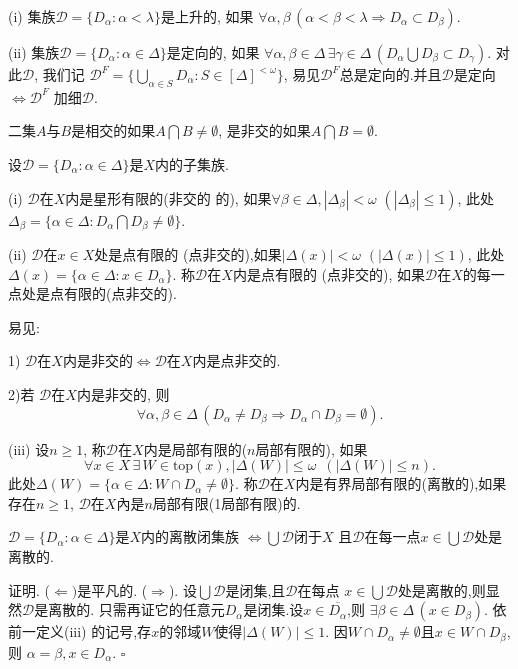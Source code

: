 \documentclass[main.tex]{subfiles}
\begin{document}
\begin{definition}
\textnormal{(i)} 集族$\mathscr{D}=\{D_\alpha: \alpha<\lambda\}$是上升的,
如果
$\forall\alpha, \beta \,(\alpha < \beta < \lambda \Rightarrow D_\alpha \subset D_\beta )$.

\textnormal{(ii)}  集族$\mathscr{D}=\{D_\alpha: \alpha\in\Delta\}$是定向的,
如果
$\forall\alpha, \beta\in\Delta\,\exists \gamma\in \Delta\,
(D_\alpha \bigcup D_\beta \subset D_\gamma)$.
对此$\mathscr{D}$, 我们记
$\mathscr{D}^F = \{\bigcup_{\alpha\in S} D_\alpha: S\in [\Delta]^{<\omega}\}$,
易见$\mathscr{D}^F$总是定向的.并且$\mathscr{D}$是定向
$\Leftrightarrow \mathscr{D}^F$ 加细$\mathscr{D}$.
\end{definition}
二集$A$与$B$是相交的如果$A\bigcap B\ne \emptyset$, 
是非交的如果$A\bigcap B=\emptyset$.

\begin{definition}
设$\mathscr{D}=\{D_\alpha: \alpha\in \Delta\}$是$X$内的子集族.

\textnormal{(i)} $\mathscr{D}$在$X$内是星形有限的\textnormal{(}非交的
的\textnormal{)}, 如果$\forall\beta\in\Delta, |\Delta_\beta| < \omega$ $(|\Delta_\beta| \le 1)$, 此处
$\Delta_\beta = \{\alpha\in\Delta: D_\alpha\bigcap D_\beta \ne \emptyset\}$.
 
\textnormal{(ii)} $\mathscr{D}$在$x\in X$处是点有限的
\textnormal{(}点非交的\textnormal{)},如果$|\Delta(x)| < \omega$ $(|\Delta(x)| \le 1)$, 此处
$\Delta(x) = \{\alpha\in\Delta: x\in D_\alpha\}$.
称$\mathscr{D}$在$X$内是点有限的 
\textnormal{(}点非交的\textnormal{)}, 如果$\mathscr{D}$在$X$的每一点处是点有限的\textnormal{(}点非交的\textnormal{)}.
\end{definition}
易见:

1) $\mathscr{D}$在$X$内是非交的$\Leftrightarrow$$\mathscr{D}$在$X$内是点非交的.

2)若 $\mathscr{D}$在$X$内是非交的, 则
$$\forall \alpha,\beta\in\Delta \,(D_\alpha \ne D_\beta
\Rightarrow D_\alpha\cap D_\beta = \emptyset).$$

{\kaishu
(iii) 设$n\ge 1$, 称$\mathscr{D}$在$X$内是局部有限的($n$局部有限的),
如果
$$\forall x\in X\, \exists\,W\in\textrm{top}(x), |\Delta(W)| \le \omega\,\,\, (|\Delta(W)| \le n).$$
此处$\Delta(W)= \{\alpha\in \Delta: W\cap D_\alpha \ne \emptyset\}$.
称$\mathscr{D}$在$X$内是有界局部有限的(离散的),如果存在$n\ge 1$, 
$\mathscr{D}$在$X$內是$n$局部有限(1局部有限)的.
}

\begin{fact}
$\mathscr{D}=\{D_\alpha: \alpha\in \Delta\}$是$X$内的离散闭集族
$\Leftrightarrow\bigcup\mathscr{D}$闭于$X$ 
且$\mathscr{D}$在每一点$x\in\bigcup\mathscr{D}$处是离散的.
\end{fact}
证明. ($\Leftarrow)$是平凡的.
($\Rightarrow$). 设$\bigcup\mathscr{D}$是闭集,且$\mathscr{D}$在每点
$x\in\bigcup\mathscr{D}$处是离散的,则显然$\mathscr{D}$是离散的.
只需再证它的任意元$D_\alpha$是闭集.设$x\in\overline{D_\alpha}$,则
$\exists\beta\in\Delta \, (x\in D_\beta)$.
依前一定义(iii) 的记号,存$x$的邻域$W$使得$|\Delta(W)|\le 1$. 
因$W\cap D_\alpha \ne \emptyset$且$x\in W\cap D_\beta$, 则
$\alpha = \beta, x\in D_\alpha$.
$\square$
\end{document}
